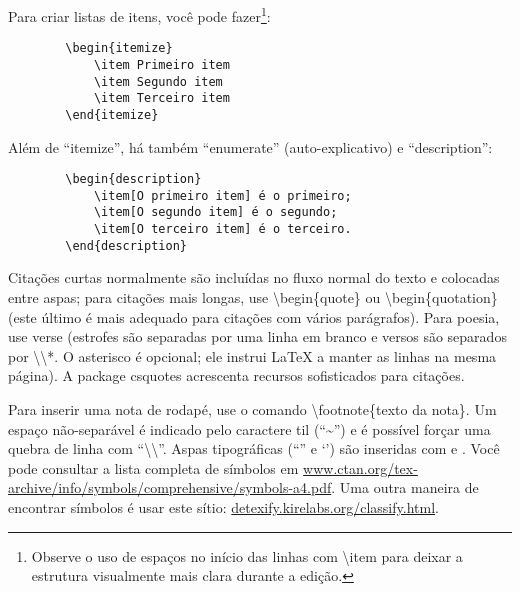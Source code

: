 Para criar listas de itens, você pode fazer\footnote{Observe o uso de
espaços no início das linhas com \textsf{\textbackslash{}item} para deixar a
estrutura visualmente mais clara durante a edição.}:

\begin{verbatim}
        \begin{itemize}
            \item Primeiro item
            \item Segundo item
            \item Terceiro item
        \end{itemize}
\end{verbatim}

Além de ``itemize'', há também ``enumerate'' (auto-explicativo) e ``description'':

\begin{verbatim}
        \begin{description}
            \item[O primeiro item] é o primeiro;
            \item[O segundo item] é o segundo;
            \item[O terceiro item] é o terceiro.
        \end{description}
\end{verbatim}

Citações curtas normalmente são incluídas no fluxo normal do texto e colocadas
entre aspas; para citações mais longas, use \textsf{\textbackslash{}begin\{quote\}}
ou \textsf{\textbackslash{}begin\{quotation\}} (este último é mais adequado
para citações com vários parágrafos). Para poesia, use \textsf{verse}
(estrofes são separadas por uma linha em branco e versos são separados por
\textsf{\textbackslash{}\textbackslash{}*}. O asterisco é opcional; ele
instrui \LaTeX{} a manter as linhas na mesma página). A package
\textsf{csquotes} acrescenta recursos sofisticados para citações.

Para inserir uma nota de rodapé, use o comando
\textsf{\textbackslash{}footnote\{texto da nota\}}.
Um espaço não-separável é indicado pelo caractere til (``\textasciitilde{}'')
e é possível forçar uma quebra de linha com
``\textsf{\textbackslash{}\textbackslash{}}''. Aspas tipográficas (``'' e `')
são inseridas com
\textasciigrave\textasciigrave\textquotesingle\textquotesingle{} e
\textasciigrave\textquotesingle. Você pode consultar a lista completa de
símbolos em \url{www.ctan.org/tex-archive/info/symbols/comprehensive/symbols-a4.pdf}.
Uma outra maneira de encontrar símbolos é usar este sítio: \url{detexify.kirelabs.org/classify.html}.


